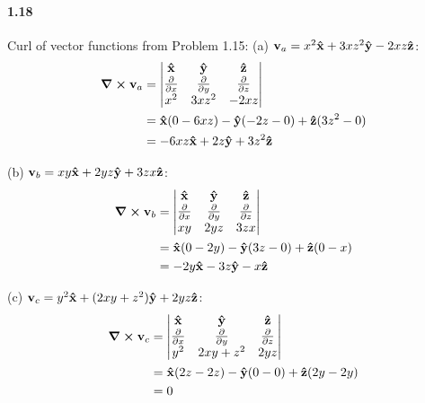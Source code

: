 \documentclass[../main.tex]{subfiles}
\begin{document}
\paragraph{1.18}
Curl of vector functions from Problem 1.15:
(a) $\vb{v}_a = x^2\vu{x} + 3xz^2\vu{y} - 2xz\vu{z}$:
\begin{align*}
    \curl{\vb{v}_a} &= \mqty|
        \vu{x} & \vu{y} & \vu{z} \\
        \pdv{x} & \pdv{y} & \pdv{z} \\
        x^2 & 3xz^2 & -2xz
    | \\
    &= \vu{x} (0 - 6xz) - \vu{y} (-2z - 0) + \vu{z} (3z^2 - 0) \\
    &= -6xz\vu{x} + 2z\vu{y} + 3z^2\vu{z}
\end{align*}

(b) $\vb{v}_b = xy\vu{x} + 2yz\vu{y} + 3zx\vu{z}$:
\begin{align*}
    \curl{\vb{v}_b} &= \begin{vmatrix}
        \vu{x} & \vu{y} & \vu{z} \\
        \pdv{x} & \pdv{y} & \pdv{z} \\
        xy & 2yz & 3zx
    \end{vmatrix} \\
    &= \vu{x} (0 - 2y) - \vu{y} (3z - 0) + \vu{z} (0 - x) \\
    &= -2y\vu{x} - 3z\vu{y} - x\vu{z}
\end{align*}

(c) $\vb{v}_c = y^2\vu{x} + (2xy + z^2)\vu{y} + 2yz\vu{z}$:
\begin{align*}
    \curl{\vb{v}_c} &= \begin{vmatrix}
        \vu{x} & \vu{y} & \vu{z} \\
        \pdv{x} & \pdv{y} & \pdv{z} \\
        y^2 & 2xy + z^2 & 2yz
    \end{vmatrix} \\
    &= \vu{x} (2z - 2z) - \vu{y} (0 - 0) + \vu{z} (2y - 2y) \\
    &= 0
\end{align*}
\end{document}
